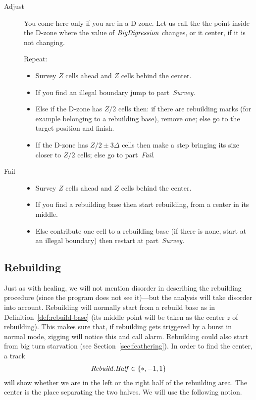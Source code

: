 \documentclass[11pt]{memoir}
\theoremstyle{definition} %
\newcommand{\fld}[1]{\ensuremath{\textit{#1\/}}}
\newcommand{\instr}{\item[]\hspace{-0.6em}}
\newcommand{\Z}{Z} %
\newcommand{\z}{z} %
\newcommand{\BigDigression}{\fld{BigDigression}}
\newcommand{\Half}{\fld{Half}} %
\newcommand{\Rebuild}{\fld{Rebuild}} %
\begin{document}
\begin{description}
\item[Adjust] You come here only if you are in a D-zone.
  Let us call the  the point inside the D-zone where the
  value of \( \BigDigression \) changes, or it center, if it is not changing.  
  
  Repeat:
  \begin{itemize}
    \instr Survey \( \Z \) cells ahead and \( \Z \) cells behind the center.
    \instr If you find an illegal boundary jump to part~\emph{Survey}.
    \instr  Else if the D-zone has \( \Z/2 \) cells then:
    if there are rebuilding marks (for example belonging to a rebuilding base), remove one;
    else go to the target position and finish.
    \instr  If the D-zone has \( \Z/2\pm 3\Delta \) cells then
  make a step bringing its size closer to \( \Z/2 \) cells; else go to part~\emph{Fail}.
  \end{itemize}
  
\item[Fail]
  \begin{itemize}
  \instr Survey \( \Z \) cells ahead and \( \Z \) cells behind the center.
  \instr If you find a rebuilding base then start rebuilding, from a center in its middle.
  \instr Else contribute one cell to a rebuilding base (if there is none, start at an illegal boundary)
  then restart at part~\emph{Survey}.
  \end{itemize}
  
\end{description}


\subsection{Rebuilding}\label{sec:rebuilding}

Just as with healing, we will not mention disorder in describing the rebuilding procedure
(since the program does not see it)---but the analysis will take disorder into account.
Rebuilding will normally start from a rebuild base as in Definition~\ref{def:rebuild-base}
(its middle point will be taken as the center \( \z \) of rebuilding).
This makes sure that, if rebuilding gets triggered by a burst in normal mode, zigging will
notice this and call alarm.
Rebuilding could also start from big turn starvation (see Section~\ref{sec:feathering}).
In order to find the center, a track
\begin{align*}
   \Rebuild.\Half\in\{*,-1,1\}
\end{align*}
will show whether we are in the left or the right half of the rebuilding area.
The center is the place separating the two halves.
We will use the following notion.
\end{document}

